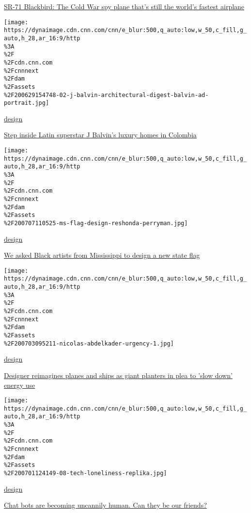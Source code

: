 \href{/style/article/sr-71-blackbird-spy-plane-design/index.html}{SR-71
Blackbird: The Cold War spy plane that's still the world's fastest
airplane}

\href{/style/article/j-balvin-architectural-digest/index.html}{}

\texttt{[image: https://dynaimage.cdn.cnn.com/cnn/e\_blur:500,q\_auto:low,w\_50,c\_fill,g\_auto,h\_28,ar\_16:9/http\\\%3A\\\%2F\\\%2Fcdn.cnn.com\\\%2Fcnnnext\\\%2Fdam\\\%2Fassets\\\%2F200629154748-02-j-balvin-architectural-digest-balvin-ad-portrait.jpg]}

\href{/style/design}{design}

\href{/style/article/j-balvin-architectural-digest/index.html}{Step
inside Latin superstar J Balvin's luxury homes in Colombia}

\href{/style/article/artists-design-mississippi-flag/index.html}{}

\texttt{[image: https://dynaimage.cdn.cnn.com/cnn/e\_blur:500,q\_auto:low,w\_50,c\_fill,g\_auto,h\_28,ar\_16:9/http\\\%3A\\\%2F\\\%2Fcdn.cnn.com\\\%2Fcnnnext\\\%2Fdam\\\%2Fassets\\\%2F200707110525-ms-flag-design-reshonda-perryman.jpg]}

\href{/style/design}{design}

\href{/style/article/artists-design-mississippi-flag/index.html}{We
asked Black artists from Mississippi to design a new state flag}

\href{/style/article/nicolas-abdelkader-planters/index.html}{}

\texttt{[image: https://dynaimage.cdn.cnn.com/cnn/e\_blur:500,q\_auto:low,w\_50,c\_fill,g\_auto,h\_28,ar\_16:9/http\\\%3A\\\%2F\\\%2Fcdn.cnn.com\\\%2Fcnnnext\\\%2Fdam\\\%2Fassets\\\%2F200703095211-nicolas-abdelkader-urgency-1.jpg]}

\href{/style/design}{design}

\href{/style/article/nicolas-abdelkader-planters/index.html}{Designer
reimagines planes and ships as giant planters in plea to 'slow down'
energy use}

\href{/style/article/tech-loneliness-replika-wellness/index.html}{}

\texttt{[image: https://dynaimage.cdn.cnn.com/cnn/e\_blur:500,q\_auto:low,w\_50,c\_fill,g\_auto,h\_28,ar\_16:9/http\\\%3A\\\%2F\\\%2Fcdn.cnn.com\\\%2Fcnnnext\\\%2Fdam\\\%2Fassets\\\%2F200701124149-08-tech-loneliness-replika.jpg]}

\href{/style/design}{design}

\href{/style/article/tech-loneliness-replika-wellness/index.html}{Chat
bots are becoming uncannily human. Can they be our friends?}

